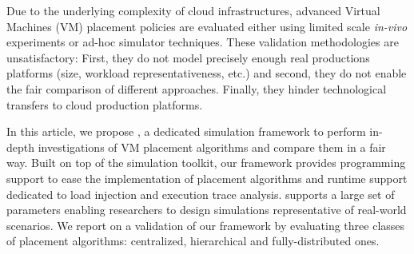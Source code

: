 

 Due to the underlying complexity of cloud infrastructures, advanced
 Virtual Machines (VM) placement policies are evaluated either using limited scale \emph{in-vivo}
experiments or ad-hoc simulator techniques. These validation
methodologies are unsatisfactory:
First, they do not model precisely enough real productions platforms (size,
workload representativeness, etc.) and second, they do not enable the
fair comparison of different approaches. Finally, they hinder
technological transfers to cloud production platforms.

In this article, we propose \vmps, a dedicated simulation framework to
perform in-depth investigations of VM placement algorithms and compare
them in a fair way. Built on top of the \sg simulation toolkit, our
framework provides programming support to ease the implementation of
placement algorithms and runtime support dedicated to load injection
and execution trace analysis.
\vmps supports a large set of parameters enabling researchers to design simulations representative of
real-world scenarios.
We report on a validation
of our framework by evaluating three classes of placement algorithms:
centralized, hierarchical and fully-distributed ones.
